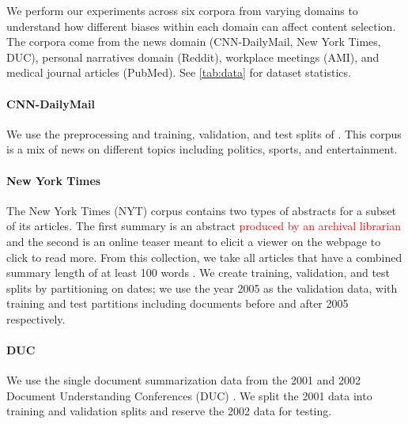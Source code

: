 We perform our experiments across six corpora from varying domains to 
understand how different biases within each domain can affect content 
selection. The corpora come from the news domain
(CNN-DailyMail, New York Times, DUC), personal narratives domain (Reddit),
workplace meetings (AMI), and medical journal articles (PubMed). See 
\autoref{tab:data} for dataset statistics.


\paragraph{CNN-DailyMail} We use the preprocessing and training, validation, 
and test splits
of \cite{see2017get}.
This corpus is a mix of news on different topics including politics,
sports, and entertainment.

\paragraph{New York Times}The New York Times (NYT) corpus \cite{sandhaus2008new} contains
 two types of abstracts for a subset of its articles. The first summary is
an abstract \textcolor{red}{produced by an archival librarian} and the 
second is an online teaser meant to elicit a viewer on the webpage to
click to read more. From this collection, we take all articles that have 
a combined summary length of at least 100 words
.
We create training, validation, and test splits by partitioning on dates;
we use the year 2005 as the validation data, with training and test partitions
including documents before and after 2005 respectively.

\paragraph{DUC} We use the single document summarization data from the 2001
and 2002
Document Understanding Conferences (DUC) \cite{over2002introduction}. We split the 2001 data into training
and validation splits and reserve the 2002 data for testing.

